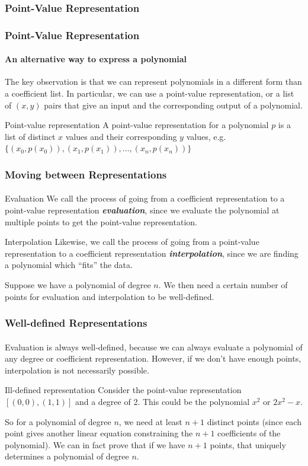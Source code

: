 \documentclass[11pt,handout]{beamer}             %
\newcommand{\emphasis}[1]{\textbf{\textit{#1}}}
\begin{document}
\subsubsection[Point-Value]{Point-Value Representation}
\begin{frame}
\frametitle{Point-Value Representation}
\framesubtitle{An alternative way to express a polynomial}
The key observation is that we can represent polynomials in a different form
than a coefficient list. In particular, we can use a \alert{point-value}
representation, or a list of \( (x, y) \) pairs that give an input and the
corresponding output of a polynomial. 
\begin{alertblock}{Point-value representation}
  A point-value representation for a polynomial \( p \) is a list of distinct
  \( x \) values and their corresponding \( y \) values, e.g.
  \( \{(x_0, p(x_0)), (x_1, p(x_1)), \ldots, (x_n, p(x_n)) \}  \)
\end{alertblock}
\end{frame}

\begin{frame}
\frametitle{Moving between Representations}
\framesubtitle{}
\begin{alertblock}{Evaluation}
  We call the process of going from
  a coefficient representation to a point-value representation
  \emphasis{evaluation}, since we evaluate the polynomial at multiple points
  to get the point-value representation.
\end{alertblock} \pause
\begin{alertblock}{Interpolation}
Likewise, we call the process of going from a point-value representation
to a coefficient representation \emphasis{interpolation}, since we are finding
a polynomial which \enquote{fits} the data. 
\end{alertblock} \pause
Suppose we have a polynomial of degree \( n \). We then need
a certain number of points for evaluation and interpolation to be well-defined.
\end{frame}

\begin{frame}
\frametitle{Well-defined Representations}
\framesubtitle{}
Evaluation is always well-defined, because we can always evaluate a polynomial
of any degree or coefficient representation. However, if we don't have
enough points, interpolation is not necessarily possible. \pause 
\begin{exampleblock}{Ill-defined representation}
Consider the point-value representation \( [(0, 0), (1, 1)] \)
and a degree of 2. This could be the polynomial \( x^2 \) or \( 2x^2 - x \).
\end{exampleblock} \pause
So for a polynomial of degree \( n \), we need at least \( n + 1 \)
distinct points (since each point gives another linear equation constraining
the \( n + 1 \) coefficients of the polynomial). 
We can in fact prove that if we have \( n + 1 \) points, that uniquely
determines a polynomial of degree \( n \).
\end{frame}
\end{document}
